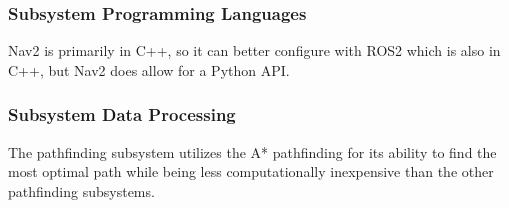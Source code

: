 \subsubsection{Subsystem Programming Languages}
Nav2 is primarily in C++, so it can better configure with ROS2 which is also in C++, but Nav2 does allow for a Python API.


\subsubsection{Subsystem Data Processing}
The pathfinding subsystem utilizes the A* pathfinding for its ability to find the most optimal path while being less computationally inexpensive than the other pathfinding subsystems. 

